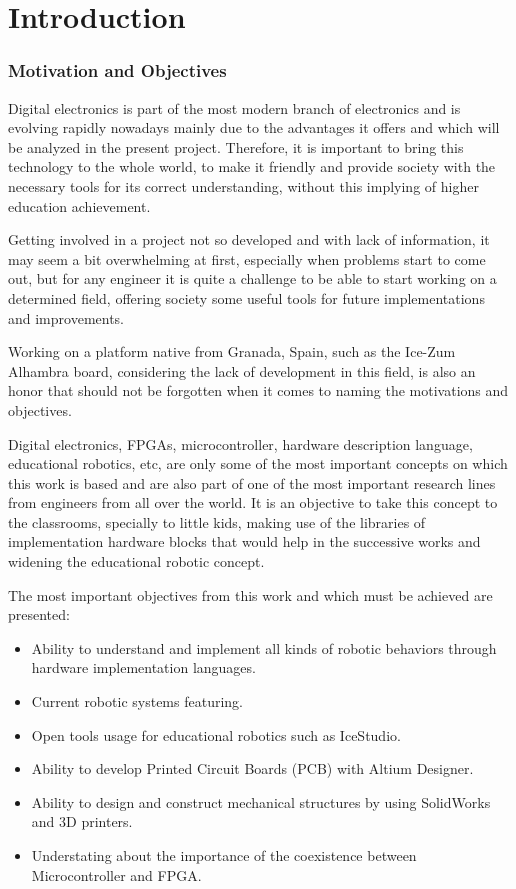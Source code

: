 \chapter{Introduction}\label{sec:intro}
\subsection{Motivation and Objectives}
Digital electronics\cite{DigialElectronics} is part of the most modern branch of electronics and is evolving rapidly nowadays mainly due to the advantages it offers and which will be analyzed in the present project. Therefore, it is important to bring this technology to the whole world, to make it friendly and provide society with the necessary tools for its correct understanding, without this implying of higher education achievement. \newline

Getting involved in a project not so developed and with lack of information, it may seem a bit overwhelming at first, especially when problems start to come out, but for any engineer it is quite a challenge to be able to start working on a determined field, offering society some useful tools for future implementations and improvements. \newline

Working on a platform native from Granada, Spain, such as the Ice-Zum Alhambra board, considering the lack of development in this field, is also an honor that should not be forgotten when it comes to naming the motivations and objectives. \newline

Digital electronics, FPGAs\cite{FPGAWhat}, microcontroller, hardware description \newline language\cite{HDL}, educational robotics\cite{6826237}, etc, are only some of the most important concepts on which this work is based and are also part of one of the most important research lines from engineers from all over the world. It is an objective to take this concept to the classrooms, specially to little kids, making use of the libraries of implementation hardware blocks that would help in the successive works and widening the educational robotic concept. \newline

The most important objectives from this work and which must be achieved are presented:
\begin{itemize}
	\item Ability to understand and implement all kinds of robotic behaviors through hardware implementation languages.
	\item Current robotic systems featuring.
	\item Open tools usage for educational robotics such as IceStudio.
	\item Ability to develop Printed Circuit Boards (PCB) with Altium Designer\cite{Altium}.
	\item Ability to design and construct mechanical structures by using SolidWorks\cite{SolidWorks} and 3D printers.
	\item Understating about the importance of the coexistence between Microcontroller and FPGA.
\end{itemize}

